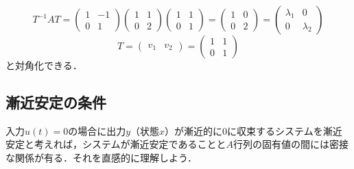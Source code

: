 \begin{equation}
 T^{-1}AT =
 \left(
 \begin{array}{cc}
  1 & -1 \\
  0 & 1
 \end{array}
 \right)
 \left(
 \begin{array}{cc}
  1 & 1 \\
  0 & 2
 \end{array}
 \right)
 \left(
 \begin{array}{cc}
  1 & 1 \\
  0 & 1
 \end{array}
 \right) =
 \left(
 \begin{array}{cc}
  1 & 0 \\
  0 & 2
 \end{array}
 \right) = 
 \left(
 \begin{array}{cc}
  \lambda_1 & 0 \\
  0 & \lambda_2
 \end{array}
 \right)
\end{equation}
\begin{equation}
  T = 
 \left(
 \begin{array}{cc}
  v_1 & v_2
 \end{array}
 \right)
 =
 \left(
 \begin{array}{cc}
  1 & 1 \\
  0 & 1
 \end{array}
 \right)
\end{equation}
と対角化できる．


\subsection{漸近安定の条件}

入力$u(t)=0$の場合に出力$y$（状態$x$）が漸近的に$0$に収束するシステムを漸近安定と考えれば，システムが漸近安定であることと$A$行列の固有値の間には密接な関係が有る．それを直感的に理解しよう．


